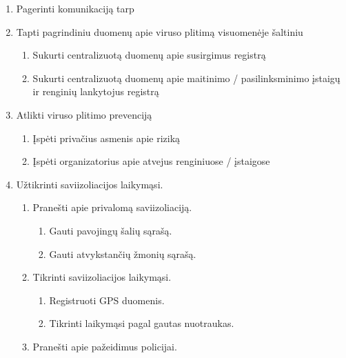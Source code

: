 \documentclass{VUMIFPSkursinis}
\begin{document}
\begin{enumerate}
	\item Pagerinti komunikaciją tarp  
	\item Tapti pagrindiniu duomenų apie viruso plitimą visuomenėje šaltiniu
		\begin{enumerate}
			\item Sukurti centralizuotą duomenų apie susirgimus registrą
			\item Sukurti centralizuotą duomenų apie maitinimo / pasilinksminimo įstaigų ir renginių lankytojus registrą
		\end{enumerate}
	\item Atlikti viruso plitimo prevenciją
	\begin{enumerate}
		\item Įspėti privačius asmenis apie riziką
		\item Įspėti organizatorius apie atvejus renginiuose / įstaigose
	\end{enumerate}
	\item Užtikrinti saviizoliacijos laikymąsi.
	\begin{enumerate}
		\item Pranešti apie privalomą saviizoliaciją.
		\begin{enumerate}
			\item Gauti pavojingų šalių sąrašą.
			\item Gauti atvykstančių žmonių sąrašą.
		\end{enumerate} 
		\item Tikrinti saviizoliacijos laikymąsi.
		\begin{enumerate}
			\item Registruoti GPS duomenis.
			\item Tikrinti laikymąsi pagal gautas nuotraukas.
		\end{enumerate} 
		\item Pranešti apie pažeidimus policijai.
	\end{enumerate}
\end{enumerate}
\end{document}
